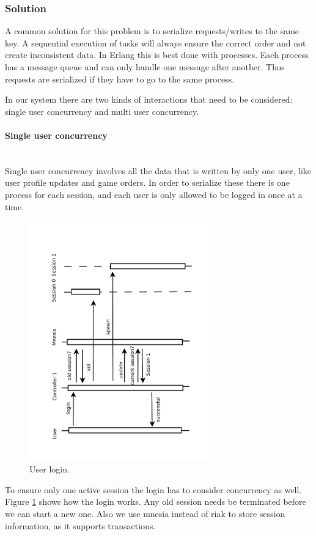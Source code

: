 \documentclass[11pt,a4paper]{report}
\newcommand{\subsubsubsection}[1]{\paragraph{#1}\mbox{}\\}
\begin{document}
\subsubsection{Solution}
A common solution for this problem is to serialize requests/writes to the same key.
A sequential execution of tasks will always ensure the correct order and not
create inconsistent data.
In Erlang this is best done with processes.
Each process has a message queue and can only handle one message after another.
Thus requests are serialized if they have to go to the same process.

In our system there are two kinds of interactions that need to be considered:
single user concurrency and multi user concurrency.

\subsubsubsection{Single user concurrency}
Single user concurrency involves all the data that is written by only one user,
like user profile updates and game orders.
In order to serialize these there is one process for each session,
and each user is only allowed to be logged in once at a time.
\begin{figure}[htbp!]
  \centering
 \includegraphics[width=8cm, angle=-90]{./graphics/Concurrency_-_Login.pdf}
 \vspace{-1cm}
 \caption{User login.}
 \label{fig:concurrency:login}
\end{figure}
To ensure only one active session the login has to consider concurrency as well.
Figure \ref{fig:concurrency:login} shows how the login works.
Any old session needs be terminated before we can start a new one.
Also we use mnesia instead of riak to store session information,
as it supports transactions.
\end{document}
